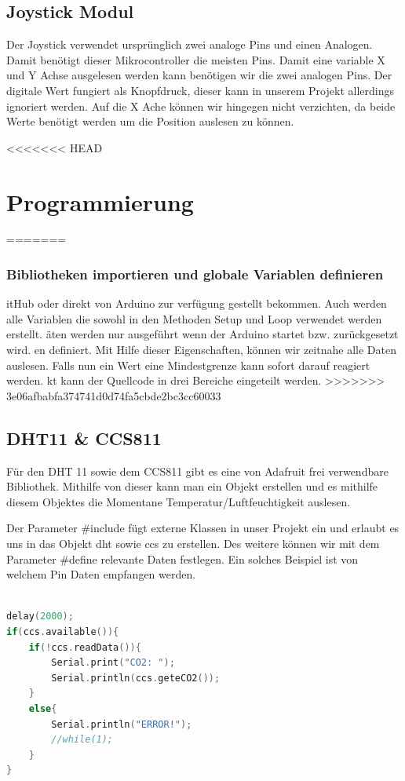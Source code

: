 \subsection{Joystick Modul}

Der Joystick verwendet ursprünglich zwei analoge Pins und einen Analogen. Damit benötigt dieser Mikrocontroller die meisten Pins. Damit eine variable X und Y Achse ausgelesen werden kann benötigen wir die zwei analogen Pins. Der digitale Wert fungiert als Knopfdruck, dieser kann in unserem Projekt allerdings ignoriert werden. Auf die X Ache können wir hingegen nicht verzichten, da beide Werte benötigt werden um die Position auslesen zu können.


<<<<<<< HEAD
\section{Programmierung}
=======
\subsubsection{Bibliotheken importieren und globale Variablen definieren}
itHub oder direkt von Arduino zur verfügung gestellt bekommen. Auch werden alle Variablen die sowohl in den Methoden Setup und Loop verwendet werden erstellt. 
äten werden nur ausgeführt wenn der Arduino startet bzw. zurückgesetzt wird.
en definiert. Mit Hilfe dieser Eigenschaften, können wir zeitnahe alle Daten auslesen. Falls nun ein Wert eine Mindestgrenze kann sofort darauf reagiert werden. 
kt kann der Quellcode in drei Bereiche eingeteilt werden. 
>>>>>>> 3e06afbabfa374741d0d74fa5cbde2bc3cc60033


\subsection{DHT11 \& CCS811}

Für den DHT 11 sowie dem CCS811 gibt es eine von Adafruit frei verwendbare Bibliothek. Mithilfe von dieser kann man ein Objekt erstellen und es mithilfe diesem Objektes die Momentane Temperatur/Luftfeuchtigkeit auslesen.



Der Parameter \#include fügt externe Klassen in unser Projekt ein und erlaubt es uns in das Objekt dht sowie ccs zu erstellen.
Des weitere können wir mit dem Parameter \#define relevante Daten festlegen. Ein solches Beispiel ist von welchem Pin Daten empfangen werden.


\begin{lstlisting}[language=C, caption=Datenauslesung CCS811, label=code:CCS811read]

delay(2000);
if(ccs.available()){
	if(!ccs.readData()){
		Serial.print("CO2: ");
		Serial.println(ccs.geteCO2());
	}
	else{
		Serial.println("ERROR!");
		//while(1);
	}
}
\end{lstlisting}


